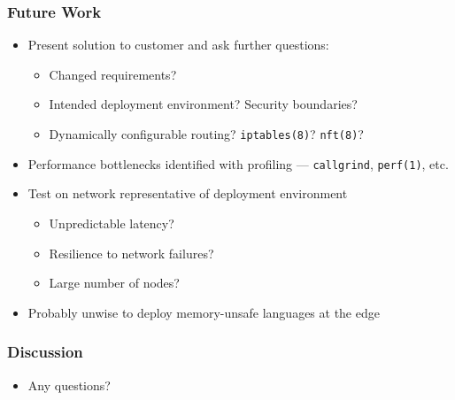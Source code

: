 \documentclass[aspectratio=169]{beamer}
\begin{document}
\begin{frame}
    \frametitle{Future Work}
    \begin{itemize}[<+->]
        \item Present solution to customer and ask further questions:
            \begin{itemize}[<.->]
                \item Changed requirements?
                \item Intended deployment environment? Security boundaries?
                \item Dynamically configurable routing? \texttt{iptables(8)}? \texttt{nft(8)}?
            \end{itemize}
        \item Performance bottlenecks identified with profiling --- \texttt{callgrind},
        \texttt{perf(1)}, etc.
        \item Test on network representative of deployment environment
            \begin{itemize}[<.->]
                \item Unpredictable latency?
                \item Resilience to network failures?
                \item Large number of nodes?
            \end{itemize}
        \item Probably unwise to deploy memory-unsafe languages at the edge
    \end{itemize}
\end{frame}
\begin{frame}
    \frametitle{Discussion}
    \begin{itemize}
        \item Any questions?
    \end{itemize}
\end{frame}
\end{document}
